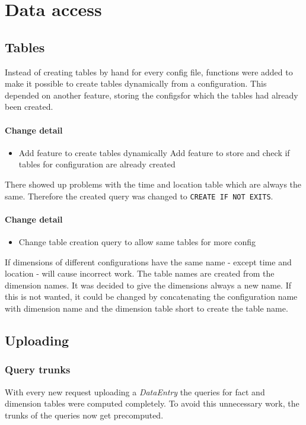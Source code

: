 \section{Data access}

\subsection{Tables}
Instead of creating tables by hand for every config file, functions
were added to make it possible to create tables dynamically from
a configuration. This depended on another feature,
storing the configsfor which the tables had already been created.

\paragraph{Change detail}
\begin{itemize}
  \item Add feature to create tables dynamically
  \itme Add feature to store and check if tables for configuration are already created
\end{itemize}

There showed up problems with the time and location table
which are always the same. Therefore the created query
was changed to \texttt{CREATE IF NOT EXITS}.

\paragraph{Change detail}
\begin{itemize}
  \item Change table creation query to allow same tables for more config
\end{itemize}

If dimensions of different configurations have the same name - except time and location -
will cause incorrect work. The table names are created from the dimension names.
It was decided to give the dimensions always a new name. If this is
not wanted, it could be changed by concatenating
the configuration name with dimension name and the dimension table short
to create the table name.

\subsection{Uploading}
\subsubsection{Query trunks}
With every new request uploading a \textit{DataEntry} the queries 
for fact and dimension tables were computed completely. To avoid
this unnecessary work, the trunks of the queries now get precomputed.

